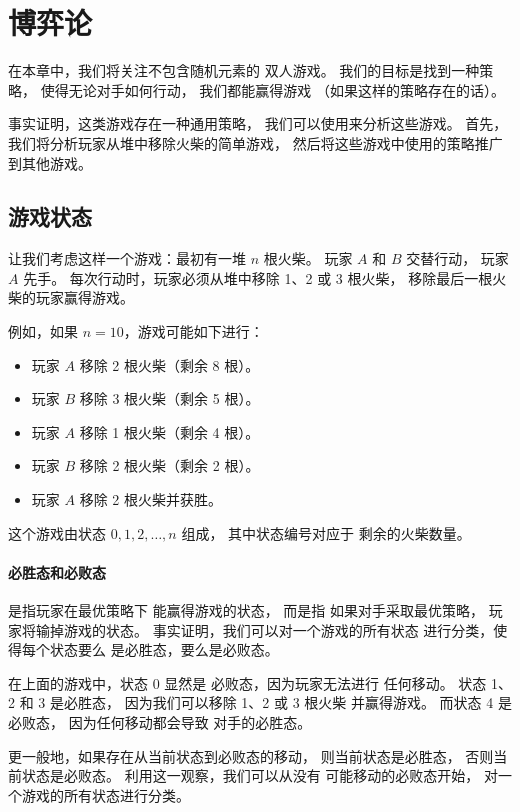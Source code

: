 \chapter{博弈论}

在本章中，我们将关注不包含随机元素的
双人游戏。
我们的目标是找到一种策略，
使得无论对手如何行动，
我们都能赢得游戏
（如果这样的策略存在的话）。

事实证明，这类游戏存在一种通用策略，
我们可以使用来分析这些游戏。
首先，我们将分析玩家从堆中移除火柴的简单游戏，
然后将这些游戏中使用的策略推广到其他游戏。

\section{游戏状态}

让我们考虑这样一个游戏：最初有一堆
$n$ 根火柴。
玩家 $A$ 和 $B$ 交替行动，
玩家 $A$ 先手。
每次行动时，玩家必须从堆中移除
1、2 或 3 根火柴，
移除最后一根火柴的玩家赢得游戏。

例如，如果 $n=10$，游戏可能如下进行：
\begin{itemize}[noitemsep]
\item 玩家 $A$ 移除 2 根火柴（剩余 8 根）。
\item 玩家 $B$ 移除 3 根火柴（剩余 5 根）。
\item 玩家 $A$ 移除 1 根火柴（剩余 4 根）。
\item 玩家 $B$ 移除 2 根火柴（剩余 2 根）。
\item 玩家 $A$ 移除 2 根火柴并获胜。
\end{itemize}

这个游戏由状态 $0,1,2,\ldots,n$ 组成，
其中状态编号对应于
剩余的火柴数量。

\subsubsection{必胜态和必败态}


是指玩家在最优策略下
能赢得游戏的状态，
而是指
如果对手采取最优策略，
玩家将输掉游戏的状态。
事实证明，我们可以对一个游戏的所有状态
进行分类，使得每个状态要么
是必胜态，要么是必败态。

在上面的游戏中，状态 0 显然是
必败态，因为玩家无法进行
任何移动。
状态 1、2 和 3 是必胜态，
因为我们可以移除 1、2 或 3 根火柴
并赢得游戏。
而状态 4 是必败态，
因为任何移动都会导致
对手的必胜态。

更一般地，如果存在从当前状态到必败态的移动，
则当前状态是必胜态，
否则当前状态是必败态。
利用这一观察，我们可以从没有
可能移动的必败态开始，
对一个游戏的所有状态进行分类。

